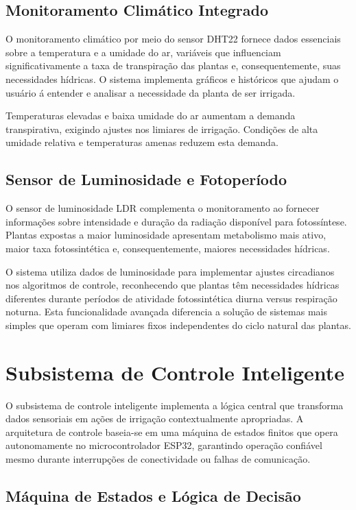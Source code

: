 \documentclass[oneside,english,brazilian]{UNISINOSmonografia}
\begin{document}
\subsection{Monitoramento Climático Integrado}

O monitoramento climático por meio do sensor DHT22 fornece dados essenciais sobre a temperatura e a umidade do ar, variáveis que influenciam significativamente a taxa de transpiração das plantas e, consequentemente, suas necessidades hídricas. O sistema implementa gráficos e históricos que ajudam o usuário á entender e analisar a necessidade da planta de ser irrigada.

Temperaturas elevadas e baixa umidade do ar aumentam a demanda transpirativa, exigindo ajustes nos limiares de irrigação. Condições de alta umidade relativa e temperaturas amenas reduzem esta demanda.

\subsection{Sensor de Luminosidade e Fotoperíodo}

O sensor de luminosidade LDR complementa o monitoramento ao fornecer informações sobre intensidade e duração da radiação disponível para fotossíntese. Plantas expostas a maior luminosidade apresentam metabolismo mais ativo, maior taxa fotossintética e, consequentemente, maiores necessidades hídricas.

O sistema utiliza dados de luminosidade para implementar ajustes circadianos nos algoritmos de controle, reconhecendo que plantas têm necessidades hídricas diferentes durante períodos de atividade fotossintética diurna versus respiração noturna. Esta funcionalidade avançada diferencia a solução de sistemas mais simples que operam com limiares fixos independentes do ciclo natural das plantas.

\section{Subsistema de Controle Inteligente}

O subsistema de controle inteligente implementa a lógica central que transforma dados sensoriais em ações de irrigação contextualmente apropriadas. A arquitetura de controle baseia-se em uma máquina de estados finitos que opera autonomamente no microcontrolador ESP32, garantindo operação confiável mesmo durante interrupções de conectividade ou falhas de comunicação.

\subsection{Máquina de Estados e Lógica de Decisão}
\end{document}
